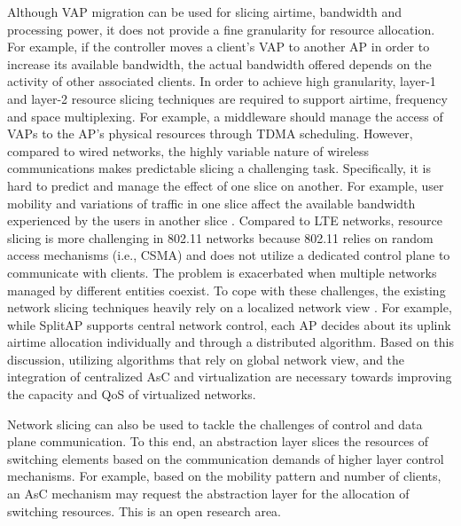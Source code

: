 Although VAP migration can be used for slicing airtime, bandwidth and processing power, it does not provide a fine granularity for resource allocation.
For example, if the controller moves a client's VAP to another AP in order to increase its available bandwidth, the actual bandwidth offered depends on the activity of other associated clients.
In order to achieve high granularity, layer-1 and layer-2 resource slicing techniques are required to support airtime, frequency and space multiplexing.
For example, a middleware should manage the access of VAPs to the AP's physical resources through TDMA scheduling.
However, compared to wired networks, the highly variable nature of wireless communications makes predictable slicing a challenging task.
Specifically, it is hard to predict and manage the effect of one slice on another. 
For example, user mobility and variations of traffic in one slice affect the available bandwidth experienced by the users in another slice \cite{nakauchi2012airtime}.
Compared to LTE networks, resource slicing is more challenging in 802.11 networks because 802.11 relies on random access mechanisms (i.e., CSMA) and does not utilize a dedicated control plane to communicate with clients.
The problem is exacerbated when multiple networks managed by different entities coexist.
To cope with these challenges, the existing network slicing techniques heavily rely on a localized network view \cite{SplitAP,ViFi}.
For example, while SplitAP supports central network control, each AP decides about its uplink airtime allocation individually and through a distributed algorithm.
Based on this discussion, utilizing algorithms that rely on global network view, and the integration of centralized AsC and virtualization are necessary towards improving the capacity and QoS of virtualized networks.


Network slicing can also be used to tackle the challenges of control and data plane communication.
To this end, an abstraction layer slices the resources of switching elements based on the communication demands of higher layer control mechanisms.
For example, based on the mobility pattern and number of clients, an AsC mechanism may request the abstraction layer for the allocation of switching resources.
This is an open research area.



